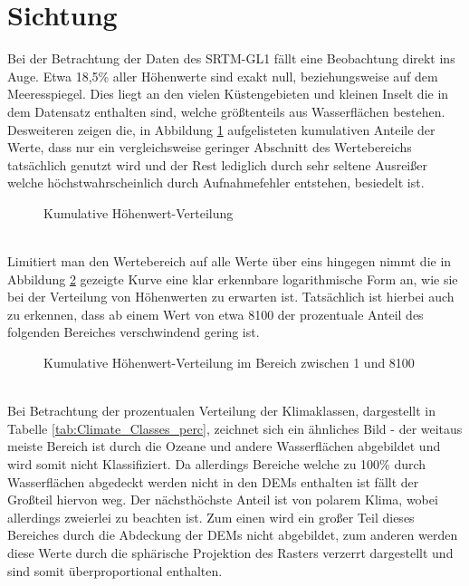 \section{Sichtung}

Bei der Betrachtung der Daten des SRTM-GL1 fällt eine Beobachtung direkt ins Auge. Etwa 18,5\% aller Höhenwerte sind exakt null, beziehungsweise auf dem Meeresspiegel. Dies liegt an den vielen Küstengebieten und kleinen Inselt die in dem Datensatz enthalten sind, welche größtenteils aus Wasserflächen bestehen. Desweiteren zeigen die, in Abbildung \ref{fig:dem_cum_hist_1} aufgelisteten kumulativen Anteile der Werte, dass nur ein vergleichsweise geringer Abschnitt des Wertebereichs tatsächlich genutzt wird und der Rest lediglich durch sehr seltene Ausreißer welche höchstwahrscheinlich durch Aufnahmefehler entstehen, besiedelt ist. 
\begin{figure}[htbp]
    \centering
    \caption{Kumulative Höhenwert-Verteilung}
    \label{fig:dem_cum_hist_1}
\end{figure} \\
Limitiert man den Wertebereich auf alle Werte über eins hingegen nimmt die in Abbildung \ref{fig:dem_cum_hist_2} gezeigte Kurve eine klar erkennbare logarithmische Form an, wie sie bei der Verteilung von Höhenwerten zu erwarten ist. Tatsächlich ist hierbei auch zu erkennen, dass ab einem Wert von etwa 8100 der prozentuale Anteil des folgenden Bereiches verschwindend gering ist.
\begin{figure}[htbp]
    \centering
    \caption{Kumulative Höhenwert-Verteilung im Bereich zwischen 1 und 8100}
    \label{fig:dem_cum_hist_2}
\end{figure} \\
Bei Betrachtung der prozentualen Verteilung der Klimaklassen, dargestellt in Tabelle \ref{tab:Climate_Classes_perc}, zeichnet sich ein ähnliches Bild - der weitaus meiste Bereich ist durch die Ozeane und andere Wasserflächen abgebildet und wird somit nicht Klassifiziert. Da allerdings Bereiche welche zu 100\% durch Wasserflächen abgedeckt werden nicht in den \ac{DEM}s enthalten ist fällt der Großteil hiervon weg. Der nächsthöchste Anteil ist von polarem Klima, wobei allerdings zweierlei zu beachten ist. Zum einen wird ein großer Teil dieses Bereiches durch die Abdeckung der \ac{DEM}s nicht abgebildet, zum anderen werden diese Werte durch die sphärische Projektion des Rasters verzerrt dargestellt und sind somit überproportional enthalten.
